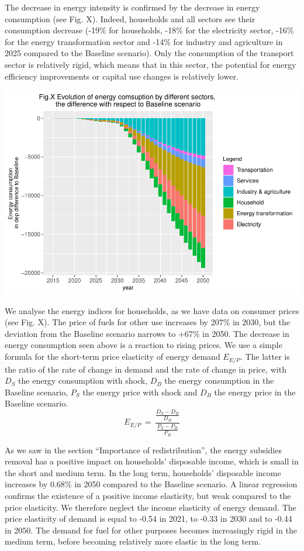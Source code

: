 \documentclass[
]{article}
\begin{document}
The decrease in energy intensity is confirmed by the decrease in energy
consumption (see Fig. X). Indeed, households and all sectors see their
consumption decrease (-19\% for households, -18\% for the electricity
sector, -16\% for the energy transformation sector and -14\% for
industry and agriculture in 2025 compared to the Baseline scenario).
Only the consumption of the transport sector is relatively rigid, which
means that in this sector, the potential for energy efficiency
improvements or capital use changes is relatively lower.

\begin{center}\includegraphics[width=0.7\linewidth,height=0.7\textheight]{Modele-ThreeMe-Tunisie_Sequeira_Valilou_Wang_files/figure-latex/unnamed-chunk-31-1} \end{center}

We analyse the energy indices for households, as we have data on
consumer prices (see Fig. X). The price of fuels for other use increases
by 207\% in 2030, but the deviation from the Baseline scenario narrows
to +67\% in 2050. The decrease in energy consumption seen above is a
reaction to rising prices. We use a simple formula for the short-term
price elasticity of energy demand \(E_{E/P}\). The latter is the ratio
of the rate of change in demand and the rate of change in price, with
\(D_S\) the energy consumption with shock, \(D_B\) the energy
consumption in the Baseline scenario, \(P_S\) the energy price with
shock and \(D_B\) the energy price in the Baseline scenario.
\[ E_{E/P} \, = \,  \frac{\frac{D_S - D_B}{D_B}}{\frac{P_S - P_B}{P_B}} \]

As we saw in the section ``Importance of redistribution'', the energy
subsidies removal has a positive impact on households' disposable
income, which is small in the short and medium term. In the long term,
households' disposable income increases by 0.68\% in 2050 compared to
the Baseline scenario. A linear regression confirms the existence of a
positive income elasticity, but weak compared to the price elasticity.
We therefore neglect the income elasticity of energy demand. The price
elasticity of demand is equal to -0.54 in 2021, to -0.33 in 2030 and to
-0.44 in 2050. The demand for fuel for other purposes becomes
increasingly rigid in the medium term, before becoming relatively more
elastic in the long term.
\end{document}
